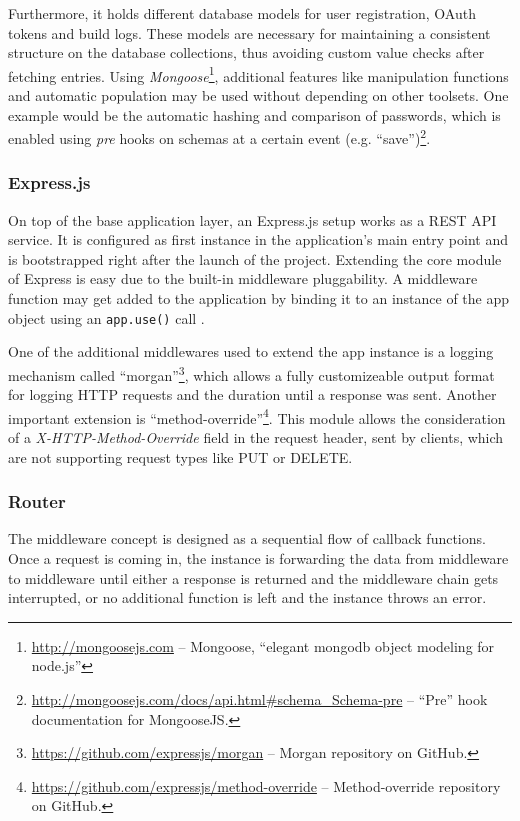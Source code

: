 Furthermore, it holds different database models for user registration, OAuth tokens and build logs. These models are necessary for maintaining a consistent structure on the database collections, thus avoiding custom value checks after fetching entries. Using \emph{Mongoose}\footnote{\url{http://mongoosejs.com} -- Mongoose, ``elegant mongodb object modeling for node.js''}, additional features like manipulation functions and automatic population may be used without depending on other toolsets. One example would be the automatic hashing and comparison of passwords, which is enabled using \emph{pre} hooks on schemas at a certain event (e.g. ``save'')\footnote{\url{http://mongoosejs.com/docs/api.html\#schema_Schema-pre} -- ``Pre'' hook documentation for MongooseJS.}.

\subsubsection{Express.js}
On top of the base application layer, an Express.js setup works as a REST API service. It is configured as first instance in the application's main entry point and is bootstrapped right after the launch of the project. Extending the core module of Express is easy due to the built-in middleware pluggability. A middleware function may get added to the application by binding it to an instance of the app object using an \texttt{app.use()} call \cite{ExpressMiddleware}.

One of the additional middlewares used to extend the app instance is a logging mechanism called ``morgan''\footnote{\url{https://github.com/expressjs/morgan} -- Morgan repository on GitHub.}, which allows a fully customizeable output format for logging HTTP requests and the duration until a response was sent. Another important extension is ``method-override''\footnote{\url{https://github.com/expressjs/method-override} -- Method-override repository on GitHub.}. This module allows the consideration of a \emph{X-HTTP-Method-Override} field in the request header, sent by clients, which are not supporting request types like PUT or DELETE.

\subsubsection{Router}
The middleware concept is designed as a sequential flow of callback functions. Once a request is coming in, the instance is forwarding the data from middleware to middleware until either a response is returned and the middleware chain gets interrupted, or no additional function is left and the instance throws an error.

